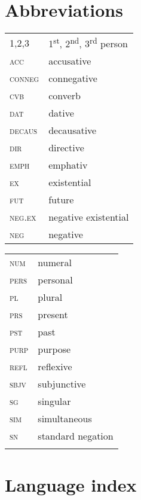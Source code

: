 \documentclass[output=paper]{langscibook}
\begin{document}
\section*{Abbreviations}
\begin{tabularx}{.45\textwidth}{lQ}
1,2,3 & 1\textsuperscript{st}, 2\textsuperscript{nd}, 3\textsuperscript{rd} person \\
\textsc{acc} & accusative\\
\textsc{conneg} & connegative\\
\textsc{cvb} & converb\\
\textsc{dat} & dative\\
\textsc{decaus} & decausative\\
\textsc{dir} & directive\\
\textsc{emph} & emphativ\\
\textsc{ex} & existential\\
\textsc{fut} & future\\
\textsc{neg.ex} & negative existential\\
\textsc{neg} & negative\\
\end{tabularx}
\begin{tabularx}{.45\textwidth}{lQ}
\textsc{num} & numeral\\
\textsc{pers} & personal\\
\textsc{pl} & plural\\
\textsc{prs} & present\\
\textsc{pst} & past\\
\textsc{purp} & purpose\\
\textsc{refl} & reflexive\\
\textsc{sbjv} & subjunctive\\
\textsc{sg} & singular\\
\textsc{sim} & simultaneous\\
\textsc{sn} & standard negation\\
\\
\end{tabularx}

\section*{Language index}
\end{document}

